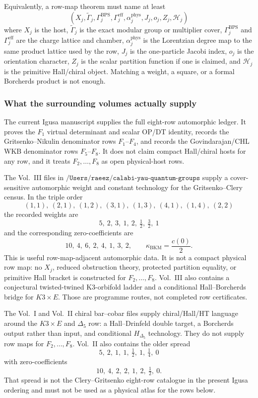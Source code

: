 Equivalently, a row-map theorem must name at least
\[
(X_j,\widetilde\Gamma_j,\Gamma^{\mathrm{BPS}}_j,\Gamma^{\mathrm{eff}}_j,
\alpha^{\mathrm{phys}}_j,J_j,o_j,Z_j,\mathcal H_j)
\]
where \(X_j\) is the host, \(\widetilde\Gamma_j\) is the exact modular
group or multiplier cover, \(\Gamma^{\mathrm{BPS}}_j\) and
\(\Gamma^{\mathrm{eff}}_j\) are the charge lattice and chamber,
\(\alpha^{\mathrm{phys}}_j\) is the Lorentzian degree map to the same
product lattice used by the row, \(J_j\) is the one-particle Jacobi
index, \(o_j\) is the orientation character, \(Z_j\) is the scalar
partition function if one is claimed, and \(\mathcal H_j\) is the
primitive Hall/chiral object.  Matching a weight, a square, or a
formal Borcherds product is not enough.

\subsubsection*{What the surrounding volumes actually supply}

The current Igusa manuscript supplies the full eight-row automorphic
ledger.  It proves the \(F_1\) virtual determinant and scalar
OP/DT identity, records the Gritsenko--Nikulin denominator rows
\(F_1\)--\(F_4\), and records the Govindarajan/CHL WKB denominator rows
\(F_5\)--\(F_8\).  It does not claim compact Hall/chiral hosts for any
row, and it treats \(F_2,\ldots,F_8\) as open physical-host rows.

The Vol.~III files in
\(\texttt{/Users/raeez/calabi-yau-quantum-groups}\) supply a
cover-sensitive automorphic weight and constant technology for the
Gritsenko--Clery census.  In the triple order
\[
(1,1),\ (2,1),\ (1,2),\ (3,1),\ (1,3),\ (4,1),\ (1,4),\ (2,2)
\]
the recorded weights are
\[
5,\ 2,\ 3,\ 1,\ 2,\ \tfrac12,\ \tfrac32,\ 1
\]
and the corresponding zero-coefficients are
\[
10,\ 4,\ 6,\ 2,\ 4,\ 1,\ 3,\ 2,
\qquad
\kappa_{\mathrm{BKM}}=\frac{c(0)}2.
\]
This is useful row-map-adjacent automorphic data.  It is not a compact
physical row map: no \(X_j\), reduced obstruction theory, protected
partition equality, or primitive Hall bracket is constructed for
\(F_2,\ldots,F_8\).  Vol.~III also contains a conjectural
twisted-twined K3-orbifold ladder and a conditional
Hall--Borcherds bridge for \(K3\times E\).  Those are programme routes,
not completed row certificates.

The Vol.~I and Vol.~II chiral bar--cobar files supply chiral/Hall/HT
language around the \(K3\times E\) and \(\Delta_5\) row: a
Hall--Drinfeld double target, a Borcherds output rather than input, and
conditional \(H_{\Delta_5}\) technology.  They do not supply row maps
for \(F_2,\ldots,F_8\).  Vol.~II also contains the older spread
\[
5,\ 2,\ 1,\ 1,\ \tfrac12,\ 1,\ \tfrac14,\ 0
\]
with zero-coefficients
\[
10,\ 4,\ 2,\ 2,\ 1,\ 2,\ \tfrac12,\ 0.
\]
That spread is not the Clery--Gritsenko eight-row catalogue in the
present Igusa ordering and must not be used as a physical atlas for
the rows below.

